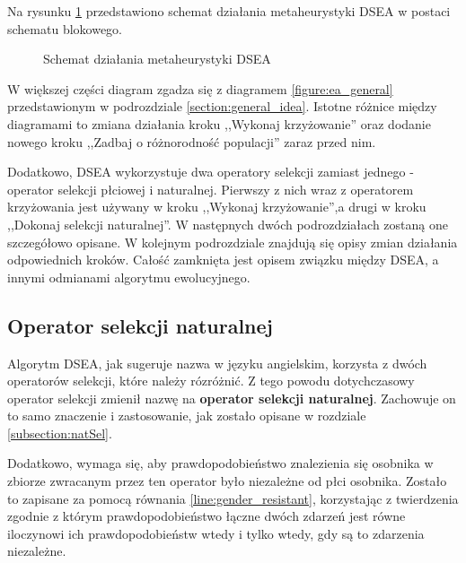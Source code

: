 \documentclass[./FM_mgr.tex]{subfiles}
\begin{document}
Na rysunku \ref{figure:dsea} przedstawiono schemat działania metaheurystyki DSEA w postaci schematu blokowego. 

\newpage

\begin{figure}[H]
	\caption{Schemat działania metaheurystyki DSEA \label{figure:dsea}}
\end{figure}

W większej części diagram zgadza się z diagramem \ref{figure:ea_general} przedstawionym w podrozdziale \ref{section:general_idea}. 
Istotne różnice między diagramami to zmiana działania kroku ,,Wykonaj krzyżowanie'' oraz dodanie nowego kroku ,,Zadbaj o różnorodność populacji'' zaraz przed nim. 

Dodatkowo, DSEA wykorzystuje dwa operatory selekcji zamiast jednego - operator selekcji płciowej i naturalnej.
Pierwszy z nich wraz z operatorem krzyżowania jest używany w kroku ,,Wykonaj krzyżowanie'',a drugi w kroku ,,Dokonaj selekcji naturalnej''.
W następnych dwóch podrozdziałach zostaną one szczegółowo opisane. 
W kolejnym podrozdziale znajdują się opisy zmian działania odpowiednich kroków.
Całość zamknięta jest opisem związku między DSEA, a innymi odmianami algorytmu ewolucyjnego.

\subsection{Operator selekcji naturalnej} \label{subsection:new_natSel}

Algorytm DSEA, jak sugeruje nazwa w języku angielskim, korzysta z dwóch operatorów selekcji, które należy rózróżnić. 
Z tego powodu dotychczasowy operator selekcji zmienił nazwę na \textbf{operator selekcji naturalnej}. 
Zachowuje on to samo znaczenie i zastosowanie, jak zostało opisane w rozdziale \ref{subsection:natSel}. 

Dodatkowo, wymaga się, aby prawdopodobieństwo znalezienia się osobnika w zbiorze zwracanym przez ten operator było niezależne od płci osobnika. 
Zostało to zapisane za pomocą równania \ref{line:gender_resistant}, korzystając z twierdzenia zgodnie z którym prawdopodobieństwo łączne dwóch zdarzeń jest równe iloczynowi ich prawdopodobieństw wtedy i tylko wtedy, gdy są to zdarzenia niezależne.
\end{document}
